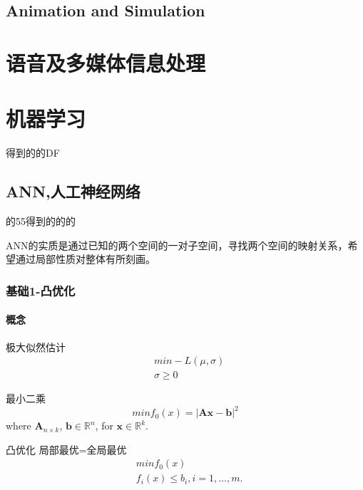 \documentclass[UTF8]{../computerUniverse}
\begin{document}
\section{Animation and Simulation}











\chapter{语音及多媒体信息处理}
 






\chapter{机器学习}

得到的的DF  

\section{ANN,人工神经网络}

的55得到的的的

ANN的实质是通过已知的两个空间的一对子空间，寻找两个空间的映射关系，希望通过局部性质对整体有所刻画。


\subsection{基础1-凸优化}
\subsubsection{概念}

极大似然估计
\begin{equation}
\begin{split}
&min -L \left( \mu ,\sigma \right)\\
&\sigma \geqslant 0
\end{split}
\end{equation}

最小二乘
\begin{equation}
min f_0(x)=\left| \mathbf {Ax-b} \right|^2
\end{equation}
where $\mathbf A_{n \times k}$, $\mathbf b\in \mathbb R^n$, for $\mathbf x\in \mathbb R^k$.

凸优化 局部最优=全局最优
\begin{equation}
    \begin{split}
    &minf_0(x) \\
    &f_i(x) \leqslant b_i,i=1,\dots,m.
    \end{split}
\end{equation} 
\end{document}
